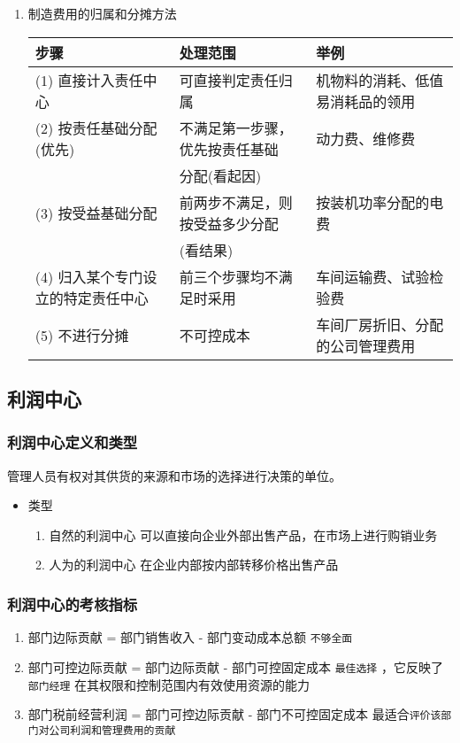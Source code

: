 \documentclass[11pt]{article}
\begin{document}
\begin{enumerate}
\item 制造费用的归属和分摊方法
\label{sec:org0fd2299}
\begin{center}
\begin{tabular}{lll}
步骤 & 处理范围 & 举例\\
\hline
(1) 直接计入责任中心 & 可直接判定责任归属 & 机物料的消耗、低值易消耗品的领用\\
\hline
(2) 按责任基础分配(优先) & 不满足第一步骤，优先按责任基础 & 动力费、维修费\\
 & 分配(看起因) & \\
\hline
(3) 按受益基础分配 & 前两步不满足，则按受益多少分配 & 按装机功率分配的电费\\
 & (看结果) & \\
\hline
(4) 归入某个专门设立的特定责任中心 & 前三个步骤均不满足时采用 & 车间运输费、试验检验费\\
\hline
(5) 不进行分摊 & 不可控成本 & 车间厂房折旧、分配的公司管理费用\\
\end{tabular}
\end{center}
\end{enumerate}
\subsection{利润中心}
\label{sec:org337c9e8}
\subsubsection{利润中心定义和类型}
\label{sec:org6388254}
管理人员有权对其供货的来源和市场的选择进行决策的单位。
\begin{itemize}
\item 类型
\begin{enumerate}
\item 自然的利润中心
可以直接向企业外部出售产品，在市场上进行购销业务
\item 人为的利润中心
在企业内部按内部转移价格出售产品
\end{enumerate}
\end{itemize}
\subsubsection{利润中心的考核指标}
\label{sec:org4f2eb96}
\begin{enumerate}
\item 部门边际贡献 = 部门销售收入 - 部门变动成本总额
\texttt{不够全面}
\item 部门可控边际贡献 = 部门边际贡献 - 部门可控固定成本
\texttt{最佳选择} ，它反映了 \texttt{部门经理} 在其权限和控制范围内有效使用资源的能力
\item 部门税前经营利润 = 部门可控边际贡献 - 部门不可控固定成本
最适合\texttt{评价该部门对公司利润和管理费用的贡献}
\end{enumerate}
\end{document}
